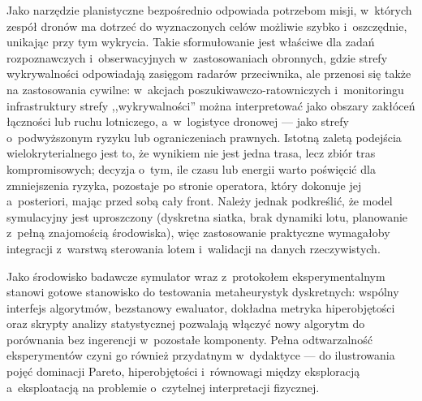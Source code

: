 Jako narzędzie planistyczne bezpośrednio odpowiada potrzebom misji, w~których
zespół dronów ma dotrzeć do wyznaczonych celów możliwie szybko i~oszczędnie,
unikając przy tym wykrycia. Takie sformułowanie jest właściwe dla zadań
rozpoznawczych i~obserwacyjnych w~zastosowaniach obronnych, gdzie strefy
wykrywalności odpowiadają zasięgom radarów przeciwnika, ale przenosi się także
na zastosowania cywilne: w~akcjach poszukiwawczo-ratowniczych i~monitoringu
infrastruktury strefy ,,wykrywalności'' można interpretować jako obszary
zakłóceń łączności lub ruchu lotniczego, a~w~logistyce dronowej --- jako strefy
o~podwyższonym ryzyku lub ograniczeniach prawnych. Istotną zaletą podejścia
wielokryterialnego jest to, że wynikiem nie jest jedna trasa, lecz zbiór tras
kompromisowych; decyzja o~tym, ile czasu lub energii warto poświęcić dla
zmniejszenia ryzyka, pozostaje po stronie operatora, który dokonuje jej
a~posteriori, mając przed sobą cały front. Należy jednak podkreślić, że model
symulacyjny jest uproszczony (dyskretna siatka, brak dynamiki lotu, planowanie
z~pełną znajomością środowiska), więc zastosowanie praktyczne wymagałoby
integracji z~warstwą sterowania lotem i~walidacji na danych rzeczywistych.

Jako środowisko badawcze symulator wraz z~protokołem eksperymentalnym stanowi
gotowe stanowisko do testowania metaheurystyk dyskretnych: wspólny interfejs
algorytmów, bezstanowy ewaluator, dokładna metryka hiperobjętości oraz skrypty
analizy statystycznej pozwalają włączyć nowy algorytm do porównania bez
ingerencji w~pozostałe komponenty. Pełna odtwarzalność eksperymentów czyni go
również przydatnym w~dydaktyce --- do ilustrowania pojęć dominacji Pareto,
hiperobjętości i~równowagi między eksploracją a~eksploatacją na problemie
o~czytelnej interpretacji fizycznej.

